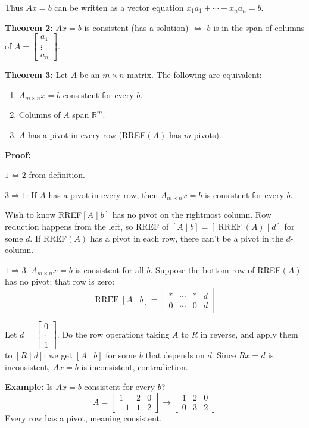 \documentclass{article}
\begin{document}
Thus $Ax = b$ can be written as a vector equation $x_1 a_1 + \cdots + x_n a_n = b$.

\bigskip

\textbf{Theorem 2:} $Ax = b$ is consistent (has a solution) $\iff$ $b$ is in the span of columns of $A = \begin{bmatrix} a_1 \\ \vdots \\ a_n \end{bmatrix}$.

\newpage

\textbf{Theorem 3:} Let $A$ be an $m \times n$ matrix. The following are equivalent:
\begin{enumerate}
\item $A_{m \times n} x = b$ consistent for every $b$.
\item Columns of $A$ span $\mathbb{R}^m$.
\item $A$ has a pivot in every row (RREF$(A)$ has $m$ pivots).
\end{enumerate}

\medskip

\textbf{Proof:}

\bigskip

$1 \iff 2$ from definition.

\bigskip

$3 \Rightarrow 1$: If $A$ has a pivot in every row, then $A_{m \times n} x = b$ is consistent for every $b$.

Wish to know RREF$[A \mid b]$ has no pivot on the rightmost column. Row reduction happens from the left, so RREF of $[A \mid b] = [\operatorname{RREF}(A) \mid d]$ for some $d$. If RREF$(A)$ has a pivot in each row, there can't be a pivot in the $d$-column.

\bigskip

$1 \Rightarrow 3$: $A_{m \times n} x = b$ is consistent for all $b$. Suppose the bottom row of RREF$(A)$ has no pivot; that row is zero:
\[
\operatorname{RREF}[A \mid b] = \left[ \begin{array}{ccc|c} * & \cdots & * & d \\ 0 & \cdots & 0 & d \end{array} \right]
\]

Let $d = \begin{bmatrix} 0 \\ \vdots \\ 1 \end{bmatrix}$. Do the row operations taking $A$ to $R$ in reverse, and apply them to $[R \mid d]$; we get $[A \mid b]$ for some $b$ that depends on $d$. Since $Rx = d$ is inconsistent, $Ax = b$ is inconsistent, contradiction.

\bigskip

\textbf{Example:} Is $Ax = b$ consistent for every $b$?
\[
A = \begin{bmatrix} 1 & 2 & 0 \\ -1 & 1 & 2 \end{bmatrix}
\to
\begin{bmatrix} 1 & 2 & 0 \\ 0 & 3 & 2 \end{bmatrix}
\]
Every row has a pivot, meaning consistent.
\end{document}
